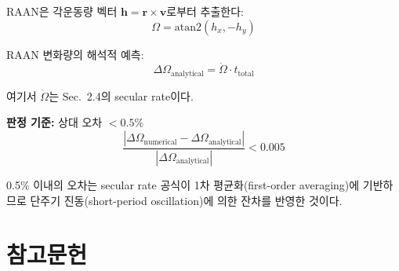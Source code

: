 \documentclass[11pt]{article}
\begin{document}
RAAN은 각운동량 벡터 $\mathbf{h} = \mathbf{r} \times \mathbf{v}$로부터 추출한다:
\[
\Omega = \text{atan2}(h_x, -h_y)
\]

RAAN 변화량의 해석적 예측:
\[
\Delta\Omega_{\text{analytical}} = \dot{\Omega} \cdot t_{\text{total}}
\]

여기서 $\dot{\Omega}$는 Sec.~2.4의 secular rate이다.

\textbf{판정 기준:} 상대 오차 $< 0.5\%$
\[
\frac{|\Delta\Omega_{\text{numerical}} - \Delta\Omega_{\text{analytical}}|}{|\Delta\Omega_{\text{analytical}}|} < 0.005
\]

0.5\% 이내의 오차는 secular rate 공식이 1차 평균화(first-order averaging)에 기반하므로 단주기 진동(short-period oscillation)에 의한 잔차를 반영한 것이다.


\section*{참고문헌}



\end{document}
